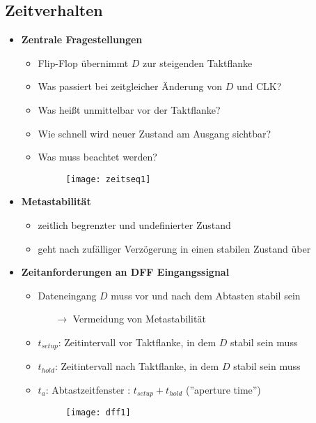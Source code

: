 \subsection{Zeitverhalten}
\begin{itemize}

\item \textbf{Zentrale Fragestellungen}
	\begin{itemize}
	
	\item Flip-Flop übernimmt $D$ zur steigenden Taktflanke
	\item Was passiert bei zeitgleicher Änderung von $D$ und CLK?
	\item Was heißt unmittelbar vor der Taktflanke?
	\item Wie schnell wird neuer Zustand am Ausgang sichtbar?
	\item Was muss beachtet werden?
	\item[] \begin{figure}[H]
				\begin{center}
				\texttt{[image: zeitseq1]}
				\end{center}
			\end{figure}
	
	
	\end{itemize}
	
\pagebreak	
	
\item \textbf{Metastabilität}
	\begin{itemize}
	\item zeitlich begrenzter und undefinierter Zustand
	\item geht nach zufälliger Verzögerung in einen stabilen Zustand über
	\end{itemize}
	
\item \textbf{Zeitanforderungen an DFF Eingangssignal}
	\begin{itemize}
	\item Dateneingang $D$ muss vor und nach dem Abtasten stabil sein
		\begin{itemize}
		\item[$\rightarrow$] Vermeidung von Metastabilität
		\end{itemize}
	
	\item $t_{setup}$: Zeitintervall vor Taktflanke, in dem $D$ stabil sein muss
	\item $t_{hold}$: Zeitintervall nach Taktflanke, in dem $D$ stabil sein muss
	\item $t_a$: Abtastzeitfenster : $t_{setup}+t_{hold}$ (''aperture time'')
	\item[] \begin{figure}[H]
				\begin{center}
				\texttt{[image: dff1]}
				\end{center}
			\end{figure}
	\end{itemize}
	

\end{itemize}
